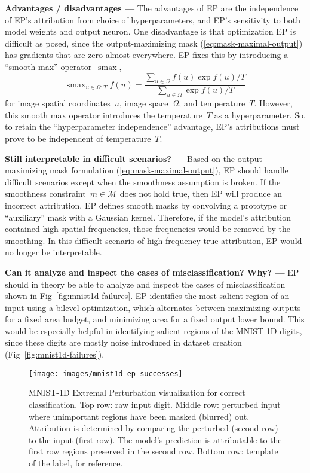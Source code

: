 \documentclass{article}
\DeclareMathOperator*{\smax}{smax}
\newcommand{\myparagraph}[1]{\noindent\textbf{#1 ---}}
\begin{document}
\myparagraph{Advantages / disadvantages} The advantages of EP are the independence of EP's attribution from choice of hyperparameters, and EP's sensitivity to both model weights and output neuron.
One disadvantage is that optimization EP is difficult as posed, since the output-maximizing mask (\ref{eq:mask-maximal-output}) has gradients that are zero almost everywhere.
EP fixes this by introducing a ``smooth max'' operator~$\smax$,
\begin{equation}
	\smax_{u\in\Omega; T} f(u) = \frac{\sum_{u\in\Omega}f(u)\exp f(u)/T}{\sum_{u\in\Omega}\exp f(u)/T}
	\label{eq:smax}
\end{equation}
for image spatial coordinates~$u$, image space~$\Omega$, and temperature~$T$.
However, this smooth max operator introduces the temperature~$T$ as a hyperparameter.
So, to retain the ``hyperparameter independence'' advantage, EP's attributions must prove to be independent of temperature~$T$.


\myparagraph{Still interpretable in difficult scenarios?} Based on the output-maximizing mask formulation (\ref{eq:mask-maximal-output}), EP should handle difficult scenarios except when the smoothness assumption is broken.
If the smoothness constraint~$m\in\mathcal{M}$ does not hold true, then EP will produce an incorrect attribution.
EP defines smooth masks by convolving a prototype or ``auxiliary'' mask with a Gaussian kernel.
Therefore, if the model's attribution contained high spatial frequencies, those frequencies would be removed by the smoothing.
In this difficult scenario of high frequency true attribution, EP would no longer be interpretable.


\myparagraph{Can it analyze and inspect the cases of misclassification? Why?} EP should in theory be able to analyze and inspect the cases of misclassification shown in Fig~\ref{fig:mnist1d-failures}.
EP identifies the most salient region of an input using a bilevel optimization, which alternates between maximizing outputs for a fixed area budget, and minimizing area for a fixed output lower bound.
This would be especially helpful in identifying salient regions of the MNIST-1D digits, since these digits are mostly noise introduced in dataset creation (Fig~\ref{fig:mnist1d-failures}).


\begin{figure}[ht]
	\texttt{[image: images/mnist1d-ep-successes]}
	\caption{\label{fig:mnist1d-ep-successes}MNIST-1D Extremal Perturbation visualization for correct classification.
		Top row: raw input digit.
		Middle row: perturbed input where unimportant regions have been masked (blurred) out.
		Attribution is determined by comparing the perturbed (second row) to the input (first row).
		The model's prediction is attributable to the first row regions preserved in the second row.
		Bottom row: template of the label, for reference.}
\end{figure}
\end{document}
